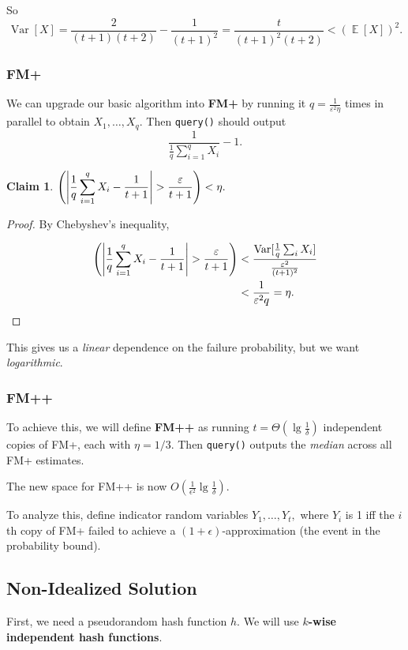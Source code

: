 \documentclass[11pt]{article}
\DeclareMathOperator*{\E}{\mathbb{E}}
\let\Pr\relax
\DeclareMathOperator*{\Pr}{\mathbb{P}}
\DeclareMathOperator*{\Var}{\operatorname{Var}}
\newcommand{\eps}{\varepsilon}
\newtheorem{claim}[theorem]{Claim}
\begin{document}
So $$\Var[X] = \frac{2}{(t+1)(t+2)} - \frac{1}{(t+1)^2} = \frac{t}{(t+1)^2(t+2)} < (\E[X])^2.$$

\subsubsection{FM+} We can upgrade our basic algorithm into \textbf{FM+} by running it $q = \frac{1}{\eps^2 \eta}$ times in parallel to obtain $X_1, \dots, X_q.$ Then \texttt{query()} should output $$\frac{1}{\frac{1}{q} \sum_{i = 1}^q X_i} - 1.$$

\begin{claim}
$\displaystyle \Pr\left(\left|\frac{1}{q} \sum_{i = 1}^q X_i - \frac{1}{t+1}\right| > \frac{\eps}{t+1}\right) < \eta.$
\end{claim}
\begin{proof}
By Chebyshev's inequality, 

\begin{align*}
\Pr\left(\left|\frac{1}{q} \sum_{i = 1}^q X_i - \frac{1}{t+1}\right| > \frac{\eps}{t+1}\right) &< \frac{\Var[\frac{1}{q} \sum_i X_i]}{\frac{\eps^2}{(t+1)^2}} \\
&< \frac{1}{\eps^2 q} = \eta.
\end{align*}
\end{proof}

This gives us a \emph{linear} dependence on the failure probability, but we want \emph{logarithmic}. 

\subsubsection{FM++} To achieve this, we will define \textbf{FM++} as running $t = \Theta(\lg\frac{1}{\delta})$ independent copies of FM+, each with $\eta = 1/3.$ Then \texttt{query()} outputs the \emph{median} across all FM+ estimates.

The new space for FM++ is now $\displaystyle O\left(\frac{1}{\epsilon^2} \lg \frac{1}{\delta}\right).$

To analyze this, define indicator random variables $Y_1, \dots, Y_t,$ where $Y_i$ is 1 iff the $i$th copy of FM+ failed to achieve a $(1+\epsilon)$-approximation (the event in the probability bound).

\subsection{Non-Idealized Solution} First, we need a pseudorandom hash function $h$. We will use \textbf{$k$-wise independent hash functions}.
\end{document}
